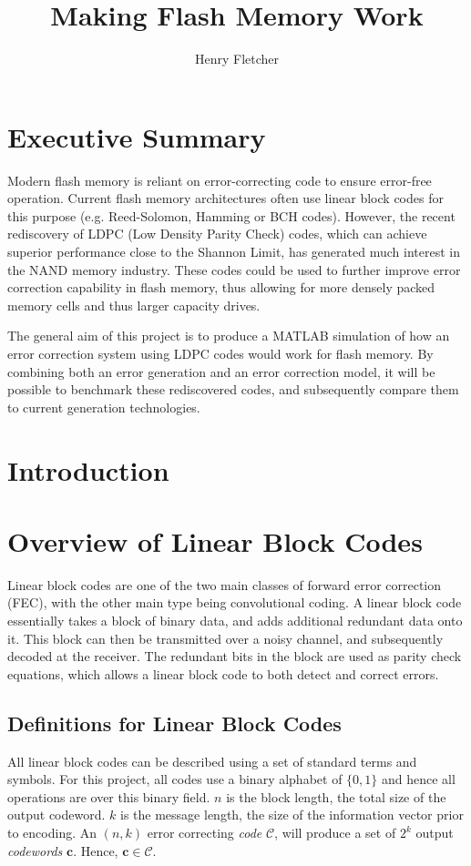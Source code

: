\documentclass[11pt]{article}
\author{Henry Fletcher}
\title{Making Flash Memory Work}
\numberwithin{equation}{subsection}
\begin{document}
\section{Executive Summary}

Modern flash memory is reliant on error-correcting code to ensure error-free operation. Current flash memory architectures often use linear block codes for this purpose (e.g. Reed-Solomon, Hamming or BCH codes). However, the recent rediscovery of LDPC (Low Density Parity Check) codes, which can achieve superior performance close to the Shannon Limit, has generated much interest in the NAND memory industry. These codes could be used to further improve error correction capability in flash memory, thus allowing for more densely packed memory cells and thus larger capacity drives.

The general aim of this project is to produce a MATLAB simulation of how an error correction system using LDPC codes would work for flash memory.  By combining both an error generation and an error correction model, it will be possible to benchmark these rediscovered codes, and subsequently compare them to current generation technologies.

\tableofcontents

\section{Introduction}

\section{Overview of Linear Block Codes}

Linear block codes are one of the two main classes of forward error correction (FEC), with the other main type being convolutional coding. A linear block code essentially takes a block of binary data, and adds additional redundant data onto it. This block can then be transmitted over a noisy channel, and subsequently decoded at the receiver. The redundant bits in the block are used as parity check equations, which allows a linear block code to both detect and correct errors. 

\subsection{Definitions for Linear Block Codes}
All linear block codes can be described using a set of standard terms and symbols. For this project, all codes use a binary alphabet of $\{0,1\}$ and hence all operations are over this binary field. $n$ is the block length, the total size of the output codeword. $k$ is the message length, the size of the information vector prior to encoding. An $(n,k)$ error correcting \textit{code} $\mathcal{C}$, will produce a set of $2^k$ output \textit{codewords} $\mathbf{c}$. Hence, $\mathbf{c} \in \mathcal{C}$. 
\end{document}
